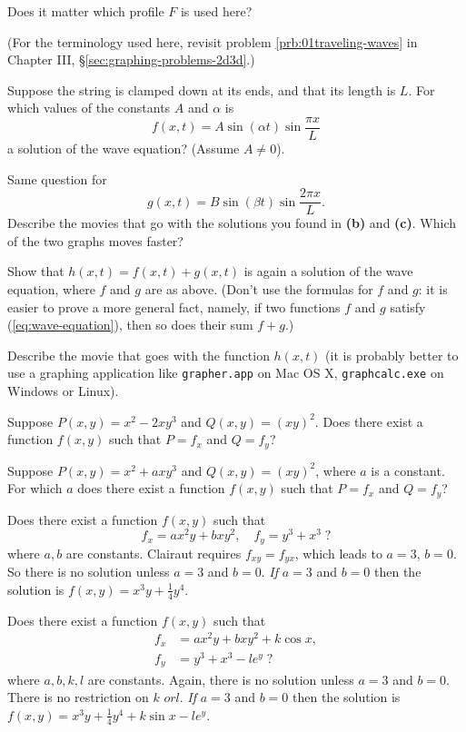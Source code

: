 \begin{multicols}{2}
Does it matter which profile $F$ is used
here?

(For the terminology used here, revisit problem
\ref{prb:01traveling-waves} in Chapter III, \S\ref{sec:graphing-problems-2d3d}.)

\subprob Suppose the string is clamped down at its ends, and that its
length is $L$.  For which values of the constants $A$ and $\alpha$ is
\[
  f(x, t) = A\sin(\alpha t) \sin \frac{\pi x}{L}
\]
a solution of the wave equation?  (Assume $A\neq0$).

\subprob Same question for 
\[
  g(x, t) =  B\sin(\beta t) \sin \frac{2\pi x}{L}.
\]
\subprob Describe the movies that go with the solutions you found in \textbf{(b)} and \textbf{(c)}.  Which of the two graphs moves faster?

\subprob Show that $h(x, t) = f(x, t)+g(x, t)$ is again a solution of the
wave equation, where $f$ and $g$ are as above.  (Don't use the formulas for
$f$ and $g$: it is easier to prove a more general fact, namely, if two
functions $f$ and $g$ satisfy (\ref{eq:wave-equation}), then so does their
sum $f+g$.)


\subprob Describe the movie that goes with the function $h(x,t)$ (it is probably better to use a graphing application like \texttt{grapher.app} on Mac OS X,
\texttt{graphcalc.exe} on Windows or Linux).

\problem Suppose $P(x, y) = x^2-2xy^3$ and $Q(x, y) = (xy)^2$.  Does  
there exist a function $f(x, y)$ such that $P= f_x$ and $Q= f_y$?

\problem Suppose $P(x, y) = x^2+axy^3$ and $Q(x, y) = (xy)^2$, where $a$  
is a constant.  For which $a$ does there exist a function $f(x, y)$ such
that $P= f_x$ and $Q= f_y$?

\problem
\subprob Does there exist a function $f(x, y)$ such that
\[
f_x = ax^2y + bxy^2, \quad f_y = y^3+x^3\;?
\]
where $a,b$ are constants.
\answer
Clairaut requires $f_{xy} = f_{yx}$, which leads to $a=3$, $b=0$.  So there is no solution unless $a=3$ and $b=0$.  \emph{If} $a=3$ and $b=0$ then the solution is $f(x,y) = x^3y + \frac14 y^4 $.
\endanswer

\subprob
Does there exist a function $f(x, y)$ such that
\begin{align*}
f_x &= ax^2y + bxy^2+k\cos x, \\
f_y &= y^3+x^3-l e^y\;?
\end{align*}
where $a, b, k, l$ are constants.
\answer
Again, there is no solution unless $a=3$ and $b=0$.  There is no restriction on $k$ $or l$.  \emph{If} $a=3$ and $b=0$ then the solution is $f(x,y) = x^3y + \frac14 y^4 + k\sin x - le^y$.
\endanswer


\end{multicols}
